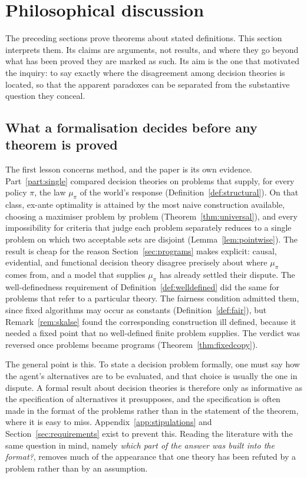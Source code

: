 \section{Philosophical discussion}\label{sec:discussion}

The preceding sections prove theorems about stated definitions. This section interprets them. Its
claims are arguments, not results, and where they go beyond what has been proved they are marked as
such. Its aim is the one that motivated the inquiry: to say exactly where the disagreement among
decision theories is located, so that the apparent paradoxes can be separated from the substantive
question they conceal.

\subsection{What a formalisation decides before any theorem is proved}\label{sec:disc-format}

The first lesson concerns method, and the paper is its own evidence. Part~\ref{part:single}
compared decision theories on problems that supply, for every policy $\pi$, the law $\mu_\pi$ of the
world's response (Definition~\ref{def:structural}). On that class, ex-ante optimality is attained by
the most naive construction available, choosing a maximiser problem by problem
(Theorem~\ref{thm:universal}), and every impossibility for criteria that judge each problem
separately reduces to a single problem on which two acceptable sets are disjoint
(Lemma~\ref{lem:pointwise}). The result is cheap for the reason Section~\ref{sec:programs} makes
explicit: causal, evidential, and functional decision theory disagree precisely about where $\mu_\pi$
comes from, and a model that supplies $\mu_\pi$ has already settled their dispute. The
well-definedness requirement of Definition~\ref{def:welldefined} did the same for problems that refer
to a particular theory. The fairness condition admitted them, since fixed algorithms may occur as
constants (Definition~\ref{def:fair}), but Remark~\ref{rem:skalse} found the corresponding
construction ill defined, because it needed a fixed point that no well-defined finite problem
supplies. The verdict was reversed once problems became programs (Theorem~\ref{thm:fixedcopy}).

The general point is this. To state a decision problem formally, one must say how the agent's
alternatives are to be evaluated, and that choice is usually the one in dispute. A formal result
about decision theories is therefore only as informative as the specification of alternatives it
presupposes, and the specification is often made in the format of the problems rather than in the
statement of the theorem, where it is easy to miss. Appendix~\ref{app:stipulations} and
Section~\ref{sec:requirements} exist to prevent this. Reading the literature with the same question
in mind, namely \emph{which part of the answer was built into the format?}, removes much of the
appearance that one theory has been refuted by a problem rather than by an assumption.

